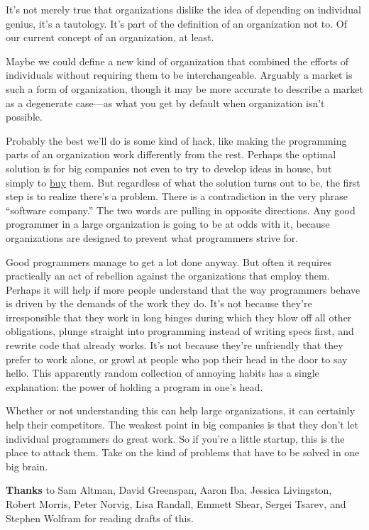 It's not merely true that organizations dislike the idea of depending on
individual genius, it's a tautology. It's part of the definition of an
organization not to. Of our current concept of an organization, at
least.

Maybe we could define a new kind of organization that combined the
efforts of individuals without requiring them to be interchangeable.
Arguably a market is such a form of organization, though it may be more
accurate to describe a market as a degenerate case---as what you get by
default when organization isn't possible.

Probably the best we'll do is some kind of hack, like making the
programming parts of an organization work differently from the rest.
Perhaps the optimal solution is for big companies not even to try to
develop ideas in house, but simply to \href{hiring.html}{buy} them. But
regardless of what the solution turns out to be, the first step is to
realize there's a problem. There is a contradiction in the very phrase
``software company.'' The two words are pulling in opposite directions.
Any good programmer in a large organization is going to be at odds with
it, because organizations are designed to prevent what programmers
strive for.

Good programmers manage to get a lot done anyway. But often it requires
practically an act of rebellion against the organizations that employ
them. Perhaps it will help if more people understand that the way
programmers behave is driven by the demands of the work they do. It's
not because they're irresponsible that they work in long binges during
which they blow off all other obligations, plunge straight into
programming instead of writing specs first, and rewrite code that
already works. It's not because they're unfriendly that they prefer to
work alone, or growl at people who pop their head in the door to say
hello. This apparently random collection of annoying habits has a single
explanation: the power of holding a program in one's head.

Whether or not understanding this can help large organizations, it can
certainly help their competitors. The weakest point in big companies is
that they don't let individual programmers do great work. So if you're a
little startup, this is the place to attack them. Take on the kind of
problems that have to be solved in one big brain.

\textbf{Thanks} to Sam Altman, David Greenspan, Aaron Iba, Jessica
Livingston, Robert Morris, Peter Norvig, Lisa Randall, Emmett Shear,
Sergei Tsarev, and Stephen Wolfram for reading drafts of this.
